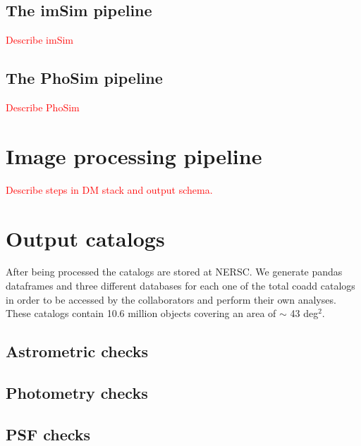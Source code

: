 \documentclass[\docopts]{\docclass}
\begin{document}
\subsection{The imSim pipeline}
\label{sec:imsim_pipeline}

\textcolor{red}{Describe imSim}

\subsection{The PhoSim pipeline}
\label{sec:phosim_pipeline}

\textcolor{red}{Describe PhoSim}

\section{Image processing pipeline}
\label{sec:image_processing_pipeline}


\textcolor{red}{Describe steps in DM stack and output schema.}

\section{Output catalogs}
\label{sec:catalogs}

After being processed the catalogs are stored at NERSC. We generate pandas dataframes and three different databases for each one of the total coadd catalogs in order to be accessed by the collaborators and perform their own analyses. These catalogs contain 10.6 million objects covering an area of $\sim$ 43 deg$^{2}$.

\subsection{Astrometric checks}
\label{sec:astrometric_checks}

\subsection{Photometry checks}
\label{sec:photometry_checks}

\subsection{PSF checks}
\label{sec:psf_checks}
\end{document}
